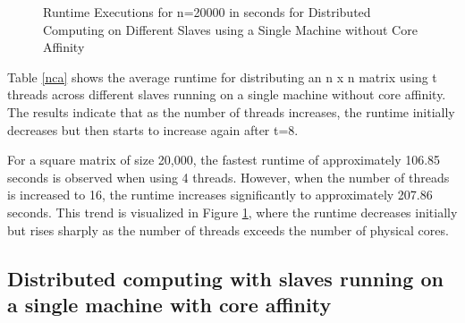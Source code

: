 \documentclass[journal]{./IEEE/IEEEtran}
\begin{document}
\begin{figure}
    \centering
    \caption{Runtime Executions for n=20000 in seconds for Distributed Computing on Different Slaves using a Single Machine without Core Affinity}
    \label{nca_chart}
\end{figure}

Table \ref{nca} shows the average runtime for distributing an n x n matrix using t threads across different slaves running on a single machine without core affinity. The results indicate that as the number of threads increases, the runtime initially decreases but then starts to increase again after t=8.

For a square matrix of size 20,000, the fastest runtime of approximately 106.85 seconds is observed when using 4 threads. However, when the number of threads is increased to 16, the runtime increases significantly to approximately 207.86 seconds. This trend is visualized in Figure \ref{nca_chart}, where the runtime decreases initially but rises sharply as the number of threads exceeds the number of physical cores.

\subsection{Distributed computing with slaves running on a single machine with core affinity}
\end{document}
